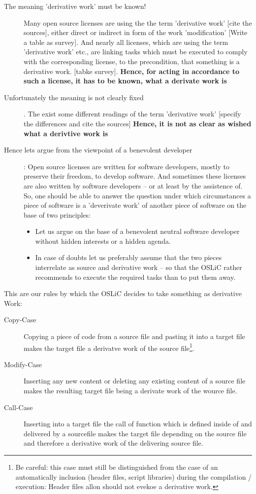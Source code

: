 \begin{description}
  \item[The meaning 'derivative work' must be known!] Many open source licenses
  are using the the term 'derivative work'  [cite the sources], either direct or
  indirect in form of the work 'modification' [Write a table as survey]. And
  nearly all licenses, which are using the term 'derivative work' etc., are
  linking tasks which must be executed to comply with the corresponding license,
  to the precondition, that something is a derivative work.
  [tabke survey]. \textbf{Hence, for acting in accordance to such a license, it
  has to be known, what a derivate work is}
  \item[Unfortunately the meaning is not clearly fixed]. The exist some
  different readings of the term 'derivative work' [specify the differences and
  cite the sources] \textbf{Hence, it is not as clear as wished what a derivtive
  work is}
  \item[Hence lets argue from the viewpoint of a benevolent developer]: Open
  source licenses are written for software developers, mostly to preserve their
  freedom, to develop software. And sometimes these licenses are also written by
  software developers -- or at least by the assistence of. So, one should be
  able to answer the question under which circumstances a piece of software is a
  'deverivate work' of another piece of software on the base of two principles:
  \begin{itemize}
  \item Let us argue on the base of a benevolent neutral software developer
  without hidden interests or a hidden agenda.
  \item In case of doubts let us preferably assume that the two pieces
  interrelate as source and derivative work -- so that the OSLiC rather recommends
  to execute the required tasks than to put them away.
\end{itemize}
\end{description}

This are our rules by which the OSLiC decides to take something as derivative Work:

\begin{description}
  \item[Copy-Case] Copying a piece of code from a source file and pasting it
  into a target file makes the target file a derivatve work of the source
  file\footnote{ Be careful: this case must still be distinguished from the case
  of an automatically inclusion (header files, script libraries) during the
  compilation / execution: Header files allon should not evekoe a derivative work.}.
  \item[Modify-Case] Inserting any new content or deleting any existing content
  of a source file makes the resulting target file being a derivate work of the
  wource file.
  \item[Call-Case] Inserting into a target file the call of function which is
  defined inside of and delivered by a sourcefile makes the target file depending
  on the source file and therefore a derivative work of the delivering source file.
\end{description}

